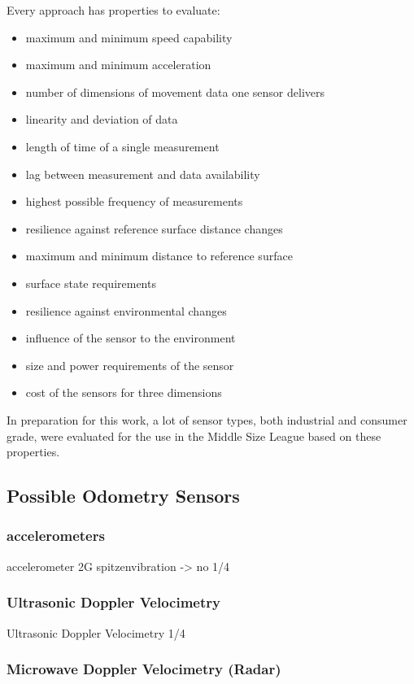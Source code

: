 \documentclass[12pt,a4paper]{article}
\newcommand{\MSL}{Middle Size League\xspace}
\begin{document}
Every approach has properties to evaluate:
\begin{itemize}
  \item maximum and minimum speed capability
  \item maximum and minimum acceleration
  \item number of dimensions of movement data one sensor delivers
  \item linearity and deviation of data
  \item length of time of a single measurement
  \item lag between measurement and data availability
  \item highest possible frequency of measurements
  \item resilience against reference surface distance changes
  \item maximum and minimum distance to reference surface
  \item surface state requirements
  \item resilience against environmental changes
  \item influence of the sensor to the environment 
  \item size and power requirements of the sensor
  \item cost of the sensors for three dimensions
\end{itemize}

In preparation for this work, a lot of sensor types, both industrial and consumer grade, were evaluated for the use in the \MSL based on these properties.


\subsection{Possible Odometry Sensors}

\subsubsection{accelerometers}


      accelerometer
        2G spitzenvibration -> no
1/4
\subsubsection{Ultrasonic Doppler Velocimetry}
      Ultrasonic Doppler Velocimetry
1/4
\subsubsection{Microwave Doppler Velocimetry (Radar)}
\end{document}

